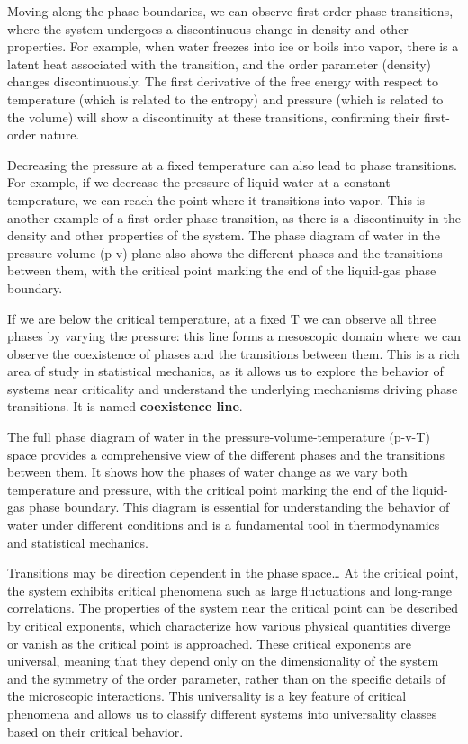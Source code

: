 Moving along the phase boundaries, we can observe first-order phase transitions, where the system undergoes a discontinuous change in density and other properties. For example, when water freezes into ice or boils into vapor, there is a latent heat associated with the transition, and the order parameter (density) changes discontinuously. The first derivative of the free energy with respect to temperature (which is related to the entropy) and pressure (which is related to the volume) will show a discontinuity at these transitions, confirming their first-order nature.

 Decreasing the pressure at a fixed temperature can also lead to phase transitions. For example, if we decrease the pressure of liquid water at a constant temperature, we can reach the point where it transitions into vapor. This is another example of a first-order phase transition, as there is a discontinuity in the density and other properties of the system. The phase diagram of water in the pressure-volume (p-v) plane also shows the different phases and the transitions between them, with the critical point marking the end of the liquid-gas phase boundary.

If we are below the critical temperature, at a fixed T we can observe all three phases by varying the pressure: this line forms a mesoscopic domain where we can observe the coexistence of phases and the transitions between them. This is a rich area of study in statistical mechanics, as it allows us to explore the behavior of systems near criticality and understand the underlying mechanisms driving phase transitions. It is named \textbf{coexistence line}.

 The full phase diagram of water in the pressure-volume-temperature (p-v-T) space provides a comprehensive view of the different phases and the transitions between them. It shows how the phases of water change as we vary both temperature and pressure, with the critical point marking the end of the liquid-gas phase boundary. This diagram is essential for understanding the behavior of water under different conditions and is a fundamental tool in thermodynamics and statistical mechanics.

Transitions may be direction dependent in the phase space\dots
At the critical point, the system exhibits critical phenomena such as large fluctuations and long-range correlations. The properties of the system near the critical point can be described by critical exponents, which characterize how various physical quantities diverge or vanish as the critical point is approached. These critical exponents are universal, meaning that they depend only on the dimensionality of the system and the symmetry of the order parameter, rather than on the specific details of the microscopic interactions. This universality is a key feature of critical phenomena and allows us to classify different systems into universality classes based on their critical behavior.

